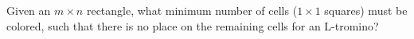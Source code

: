 Given an $m \times n$ rectangle, what minimum number of cells ($1 \times 1$ squares) must be colored, such that there is no place on the remaining cells for an L-tromino?

